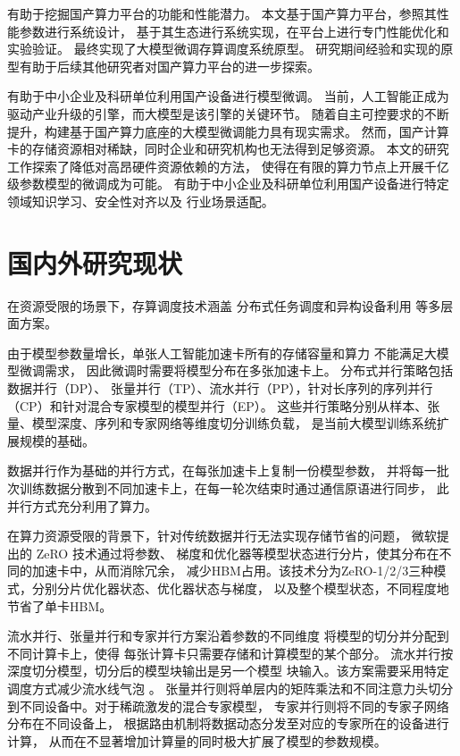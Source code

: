 \documentclass[bachelor,openany,oneside,color,AutoFakeBold=true]{buaathesis}
\begin{document}
有助于挖掘国产算力平台的功能和性能潜力。
本文基于国产算力平台，参照其性能参数进行系统设计，
基于其生态进行系统实现，在平台上进行专门性能优化和实验验证。
最终实现了大模型微调存算调度系统原型。
研究期间经验和实现的原型有助于后续其他研究者对国产算力平台的进一步探索。

有助于中小企业及科研单位利用国产设备进行模型微调。
当前，人工智能正成为驱动产业升级的引擎，而大模型是该引擎的关键环节。
随着自主可控要求的不断提升，构建基于国产算力底座的大模型微调能力具有现实需求。
然而，国产计算卡的存储资源相对稀缺，同时企业和研究机构也无法得到足够资源。
本文的研究工作探索了降低对高昂硬件资源依赖的方法，
使得在有限的算力节点上开展千亿级参数模型的微调成为可能。
有助于中小企业及科研单位利用国产设备进行特定领域知识学习、安全性对齐以及
行业场景适配。


\section{国内外研究现状}
在资源受限的场景下，存算调度技术涵盖
分布式任务调度和异构设备利用
等多层面方案。

由于模型参数量增长，单张人工智能加速卡所有的存储容量和算力
不能满足大模型微调需求，
因此微调时需要将模型分布在多张加速卡上。
分布式并行策略包括数据并行（DP）、
张量并行（TP）、流水并行（PP），针对长序列的序列并行（CP）和针对混合专家模型的模型并行（EP）。
这些并行策略分别从样本、张量、模型深度、序列和专家网络等维度切分训练负载，
是当前大模型训练系统扩展规模的基础。

数据并行作为基础的并行方式，在每张加速卡上复制一份模型参数，
并将每一批次训练数据分散到不同加速卡上，在每一轮次结束时通过通信原语进行同步，
此并行方式充分利用了算力。

在算力资源受限的背景下，针对传统数据并行无法实现存储节省的问题，
微软提出的 ZeRO 技术通过将参数、
梯度和优化器等模型状态进行分片，使其分布在不同的加速卡中，从而消除冗余，
减少HBM占用。该技术分为ZeRO-1/2/3三种模式，分别分片优化器状态、优化器状态与梯度，
以及整个模型状态，不同程度地节省了单卡HBM。

流水并行、张量并行和专家并行方案沿着参数的不同维度
将模型的切分并分配到不同计算卡上，使得
每张计算卡只需要存储和计算模型的某个部分。
流水并行按深度切分模型，切分后的模型块输出是另一个模型
块输入。该方案需要采用特定调度方式减少流水线气泡
。
张量并行则将单层内的矩阵乘法和不同注意力头切分
到不同设备中。对于稀疏激发的混合专家模型，
专家并行则将不同的专家子网络分布在不同设备上，
根据路由机制将数据动态分发至对应的专家所在的设备进行计算，
从而在不显著增加计算量的同时极大扩展了模型的参数规模。
\end{document}
